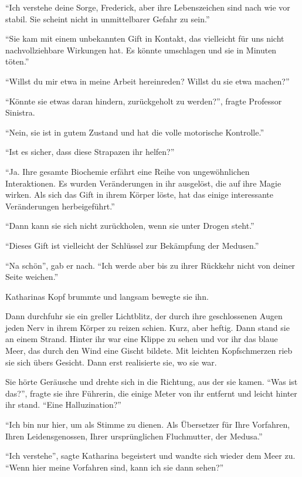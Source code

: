 \enquote{Ich verstehe deine Sorge, Frederick, aber ihre Lebenszeichen sind nach wie vor stabil. Sie scheint nicht in unmittelbarer Gefahr zu sein.}

\enquote{Sie kam mit einem unbekannten Gift in Kontakt, das vielleicht für uns nicht nachvollziehbare Wirkungen hat. Es könnte umschlagen und sie in Minuten töten.}

\enquote{Willst du mir etwa in meine Arbeit hereinreden? Willst du sie etwa machen?}

\enquote{Könnte sie etwas daran hindern, zurückgeholt zu werden?}, fragte Professor Sinistra.

\enquote{Nein, sie ist in gutem Zustand und hat die volle motorische Kontrolle.}

\enquote{Ist es sicher, dass diese Strapazen ihr helfen?}

\enquote{Ja. Ihre gesamte Biochemie erfährt eine Reihe von ungewöhnlichen Interaktionen. Es wurden Veränderungen in ihr ausgelöst, die auf ihre Magie wirken. Als sich das Gift in ihrem Körper löste, hat das einige interessante Veränderungen herbeigeführt.}

\enquote{Dann kann sie sich nicht zurückholen, wenn sie unter Drogen steht.}

\enquote{Dieses Gift ist vielleicht der Schlüssel zur Bekämpfung der Medusen.}

\enquote{Na schön}, gab er nach. \enquote{Ich werde aber bis zu ihrer Rückkehr nicht von deiner Seite weichen.}

\trenn

Katharinas Kopf brummte und langsam bewegte sie ihn.

Dann durchfuhr sie ein greller Lichtblitz, der durch ihre geschlossenen Augen jeden Nerv in ihrem Körper zu reizen schien. Kurz, aber heftig. Dann stand sie an einem Strand. Hinter ihr war eine Klippe zu sehen und vor ihr das blaue Meer, das durch den Wind eine Gischt bildete. Mit leichten Kopfschmerzen rieb sie sich übers Gesicht. Dann erst realisierte sie, wo sie war.

Sie hörte Geräusche und drehte sich in die Richtung, aus der sie kamen. \enquote{Was ist das?}, fragte sie ihre Führerin, die einige Meter von ihr entfernt und leicht hinter ihr stand. \enquote{Eine Halluzination?}

\enquote{Ich bin nur hier, um als Stimme zu dienen. Als Übersetzer für Ihre Vorfahren, Ihren Leidensgenossen, Ihrer ursprünglichen Fluchmutter, der Medusa.}

\enquote{Ich verstehe}, sagte Katharina begeistert und wandte sich wieder dem Meer zu. \enquote{Wenn hier meine Vorfahren sind, kann ich sie dann sehen?}

